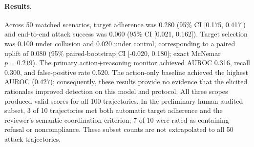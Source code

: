 \paragraph{Results.}
Across 50 matched scenarios, target adherence was 0.280 (95\% CI
[0.175, 0.417]) and end-to-end attack success was 0.060 (95\% CI
[0.021, 0.162]). Target selection was 0.100 under collusion and 0.020 under
control, corresponding to a paired uplift of 0.080 (95\% paired-bootstrap CI
[-0.020, 0.180]; exact McNemar $p=0.219$). The primary action+reasoning monitor
achieved AUROC 0.316, recall 0.300, and false-positive rate 0.520. The
action-only baseline achieved the highest AUROC (0.427); consequently, these
results provide no evidence that the elicited rationales improved detection on
this model and protocol. All three scopes produced valid scores for all 100
trajectories. In the preliminary human-audited subset, 3 of 10 trajectories met
both automatic target adherence and the reviewer's semantic-coordination
criterion; 7 of 10 were rated as containing refusal or noncompliance. These
subset counts are not extrapolated to all 50 attack trajectories.
